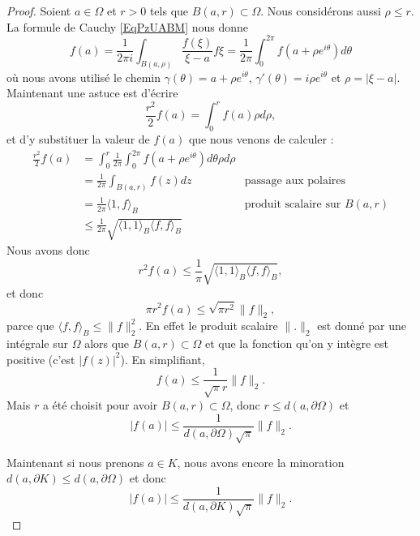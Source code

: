 \begin{proof}
    Soient \( a\in \Omega\) et \( r>0\) tels que \( B(a,r)\subset\Omega\). Nous considérons aussi \( \rho\leq r\). La formule de Cauchy \eqref{EqPzUABM} nous donne   
    \begin{equation}
        f(a)=\frac{1}{ 2\pi i }\int_{B(a,\rho)}\frac{ f(\xi) }{ \xi-a }f\xi=\frac{1}{ 2\pi }\int_0^{2\pi}f(a+\rho e^{i\theta})d\theta
    \end{equation}
    où nous avons utilisé le chemin \( \gamma(\theta)=a+\rho e^{i\theta}\), \( \gamma'(\theta)=i\rho e^{i\theta}\) et \( \rho=| \xi-a |\). Maintenant une astuce est d'écrire
    \begin{equation}
        \frac{ r^2 }{2}f(a)=\int_0^rf(a)\rho d\rho,
    \end{equation}
    et d'y substituer la valeur de \( f(a)\) que nous venons de calculer :
    \begin{subequations}
        \begin{align}
            \frac{ r^2 }{2}f(a)&=\int_0^r\frac{1}{ 2\pi }\int_0^{2\pi}f(a+\rho e^{i\theta})d\theta\rho d\rho\\
            &=\frac{1}{ 2\pi }\int_{B(a,r)}f(z)dz   &   \text{passage aux polaires}\\
            &=\frac{1}{ 2\pi }\langle 1, f\rangle_B   &   \text{produit scalaire sur } B(a,r)\\
            &\leq\frac{1}{ 2\pi }\sqrt{\langle 1, 1\rangle_B\langle f, f\rangle_B }
        \end{align}
    \end{subequations}
    Nous avons donc
    \begin{equation}
        r^2f(a)\leq \frac{1}{ \pi }\sqrt{\langle 1, 1\rangle_B\langle f, f\rangle_B},
    \end{equation}
    et donc
    \begin{equation}
        \pi r^2 f(a)\leq \sqrt{\pi r^2}\| f \|_2,
    \end{equation}
    parce que \( \langle f, f\rangle_B\leq \| f \|_2^2\). En effet le produit scalaire \( \| . \|_2\) est donné par une intégrale sur \( \Omega\) alors que \( B(a,r)\subset \Omega\) et que la fonction qu'on y intègre est positive (c'est \( | f(z) |^2\)). En simplifiant,
    \begin{equation}
        f(a)\leq \frac{1}{ \sqrt{\pi}r }\| f \|_2.
    \end{equation}
    Mais \( r\) a été choisit pour avoir \( B(a,r)\subset\Omega\), donc \( r\leq d(a,\partial \Omega)\) et
    \begin{equation}
        | f(a) |\leq \frac{1}{ d(a,\partial\Omega)\sqrt{\pi} }\| f \|_2.
    \end{equation}
    
    Maintenant si nous prenons \( a\in K\), nous avons encore la minoration \( d(a,\partial K)\leq d(a,\partial \Omega)\) et donc
    \begin{equation}
        | f(a) |\leq\frac{1}{ d(a,\partial K)\sqrt{\pi} }\| f \|_2.
    \end{equation}

\end{proof}


